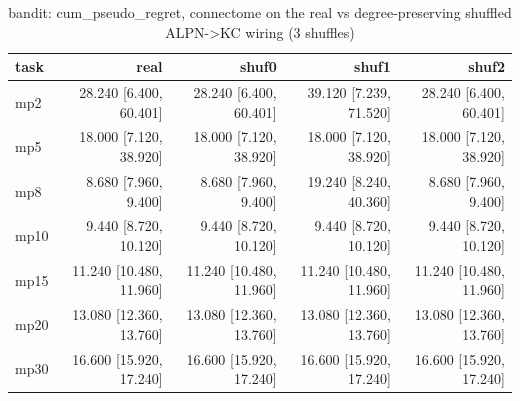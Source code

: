 \begin{table}[t]
\centering
\small
\begin{tabular}{lrrrr}
\toprule
task & real & shuf0 & shuf1 & shuf2 \\
\midrule
mp2 & 28.240 [6.400, 60.401] & 28.240 [6.400, 60.401] & 39.120 [7.239, 71.520] & 28.240 [6.400, 60.401] \\
mp5 & 18.000 [7.120, 38.920] & 18.000 [7.120, 38.920] & 18.000 [7.120, 38.920] & 18.000 [7.120, 38.920] \\
mp8 & 8.680 [7.960, 9.400] & 8.680 [7.960, 9.400] & 19.240 [8.240, 40.360] & 8.680 [7.960, 9.400] \\
mp10 & 9.440 [8.720, 10.120] & 9.440 [8.720, 10.120] & 9.440 [8.720, 10.120] & 9.440 [8.720, 10.120] \\
mp15 & 11.240 [10.480, 11.960] & 11.240 [10.480, 11.960] & 11.240 [10.480, 11.960] & 11.240 [10.480, 11.960] \\
mp20 & 13.080 [12.360, 13.760] & 13.080 [12.360, 13.760] & 13.080 [12.360, 13.760] & 13.080 [12.360, 13.760] \\
mp30 & 16.600 [15.920, 17.240] & 16.600 [15.920, 17.240] & 16.600 [15.920, 17.240] & 16.600 [15.920, 17.240] \\
\bottomrule
\end{tabular}
\caption{bandit: cum\_pseudo\_regret, connectome on the real vs degree-preserving shuffled ALPN->KC wiring (3 shuffles)}
\label{tab:wiring_bandit}
\end{table}